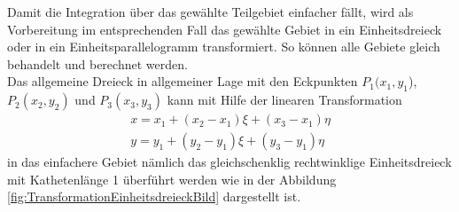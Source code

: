 Damit die Integration über das gewählte Teilgebiet einfacher fällt, wird als Vorbereitung im entsprechenden Fall das gewählte Gebiet in ein Einheitsdreieck oder in ein Einheitsparallelogramm transformiert. So können alle Gebiete gleich behandelt und berechnet werden. \\
Das allgemeine Dreieck in allgemeiner Lage mit den Eckpunkten $P_1(x_1, y_1$), $ P_2(x_2, y_2)$ und $P_3(x_3,y_3)$ kann mit Hilfe der linearen Transformation
\begin{equation}
	\begin{split}
		x = x_1 + (x_2 - x_1)\xi + (x_3 - x_1)\eta \\
		y = y_1 + (y_2 - y_1)\xi + (y_3 - y_1)\eta
		\label{fem:linTransformation}
	\end{split}
\end{equation}
in das einfachere Gebiet nämlich das gleichschenklig rechtwinklige Einheitsdreieck mit Kathetenlänge 1 überführt werden wie in der Abbildung \ref{fig:TransformationEinheitsdreieckBild} dargestellt ist.

